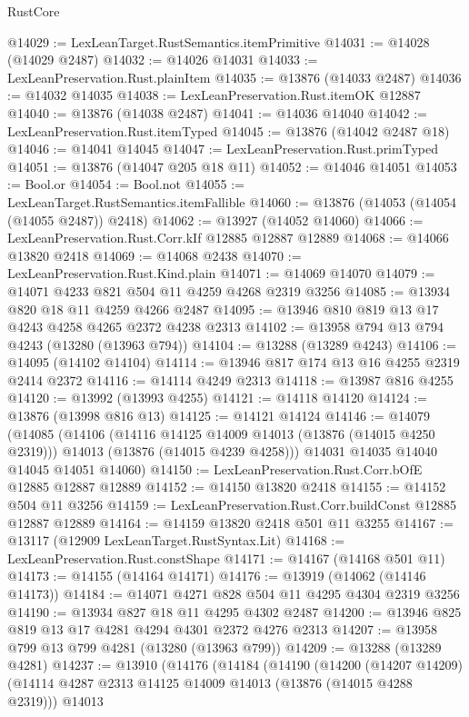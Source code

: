 \begin{lexlean}{RustCore}
\begin{coremodule}
@14029 := LexLeanTarget.RustSemantics.itemPrimitive
@14031 := @14028 (@14029 @2487)
@14032 := @14026 @14031
@14033 := LexLeanPreservation.Rust.plainItem
@14035 := @13876 (@14033 @2487)
@14036 := @14032 @14035
@14038 := LexLeanPreservation.Rust.itemOK @12887
@14040 := @13876 (@14038 @2487)
@14041 := @14036 @14040
@14042 := LexLeanPreservation.Rust.itemTyped
@14045 := @13876 (@14042 @2487 @18)
@14046 := @14041 @14045
@14047 := LexLeanPreservation.Rust.primTyped
@14051 := @13876 (@14047 @205 @18 @11)
@14052 := @14046 @14051
@14053 := Bool.or
@14054 := Bool.not
@14055 := LexLeanTarget.RustSemantics.itemFallible
@14060 := @13876 (@14053 (@14054 (@14055 @2487)) @2418)
@14062 := @13927 (@14052 @14060)
@14066 := LexLeanPreservation.Rust.Corr.kIf @12885 @12887 @12889
@14068 := @14066 @13820 @2418
@14069 := @14068 @2438
@14070 := LexLeanPreservation.Rust.Kind.plain
@14071 := @14069 @14070
@14079 := @14071 @4233 @821 @504 @11 @4259 @4268 @2319 @3256
@14085 := @13934 @820 @18 @11 @4259 @4266 @2487
@14095 := @13946 @810 @819 @13 @17 @4243 @4258 @4265 @2372 @4238 @2313
@14102 := @13958 @794 @13 @794 @4243 (@13280 (@13963 @794))
@14104 := @13288 (@13289 @4243)
@14106 := @14095 (@14102 @14104)
@14114 := @13946 @817 @174 @13 @16 @4255 @2319 @2414 @2372
@14116 := @14114 @4249 @2313
@14118 := @13987 @816 @4255
@14120 := @13992 (@13993 @4255)
@14121 := @14118 @14120
@14124 := @13876 (@13998 @816 @13)
@14125 := @14121 @14124
@14146 := @14079
    (@14085
      (@14106
        (@14116 @14125 @14009 @14013 (@13876 (@14015 @4250 @2319)))
        @14013
        (@13876 (@14015 @4239 @4258)))
      @14031
      @14035
      @14040
      @14045
      @14051
      @14060)
@14150 := LexLeanPreservation.Rust.Corr.bOfE @12885 @12887 @12889
@14152 := @14150 @13820 @2418
@14155 := @14152 @504 @11 @3256
@14159 := LexLeanPreservation.Rust.Corr.buildConst @12885 @12887 @12889
@14164 := @14159 @13820 @2418 @501 @11 @3255
@14167 := @13117 (@12909 LexLeanTarget.RustSyntax.Lit)
@14168 := LexLeanPreservation.Rust.constShape
@14171 := @14167 (@14168 @501 @11)
@14173 := @14155 (@14164 @14171)
@14176 := @13919 (@14062 (@14146 @14173))
@14184 := @14071 @4271 @828 @504 @11 @4295 @4304 @2319 @3256
@14190 := @13934 @827 @18 @11 @4295 @4302 @2487
@14200 := @13946 @825 @819 @13 @17 @4281 @4294 @4301 @2372 @4276 @2313
@14207 := @13958 @799 @13 @799 @4281 (@13280 (@13963 @799))
@14209 := @13288 (@13289 @4281)
@14237 := @13910
    (@14176
      (@14184
        (@14190
          (@14200
            (@14207 @14209)
            (@14114 @4287 @2313 @14125 @14009 @14013 (@13876 (@14015 @4288 @2319)))
            @14013

\end{coremodule}
\end{lexlean}
